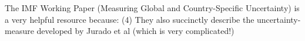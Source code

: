 \documentclass[a4paper,11pt,listof=nochaptergap,oneside,pointednumbers,bibtotoc,bigheadings,liststotoc]{scrbook}
\theoremstyle{mysatz}
\theoremstyle{mydefinition}
\theoremstyle{mybemerkung}
\begin{document}
\begin{table}[t]
\centering
\caption{Periods of high uncertainty according to macro uncertainty index h=1.}
\label{tab:macro_shocks}
\centering
\end{table}


The IMF Working Paper (Measuring Global and Country-Specific Uncertainty) is a very helpful resource because: (4) They also succinctly describe the uncertainty-measure developed by Jurado et al (which is very complicated!)
\end{document}
